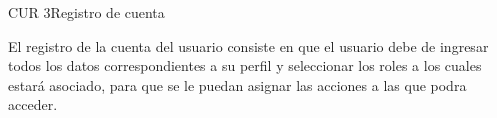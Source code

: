 \begin{UseCase}{CUR 3}{Registro de cuenta}
    {

    	
    	El registro de la cuenta del usuario consiste en que el usuario debe de ingresar todos los datos correspondientes a su perfil y seleccionar los roles a los cuales estará asociado, para que se le puedan asignar las acciones a las que podra acceder.
    
    	
    }


\end{UseCase}
